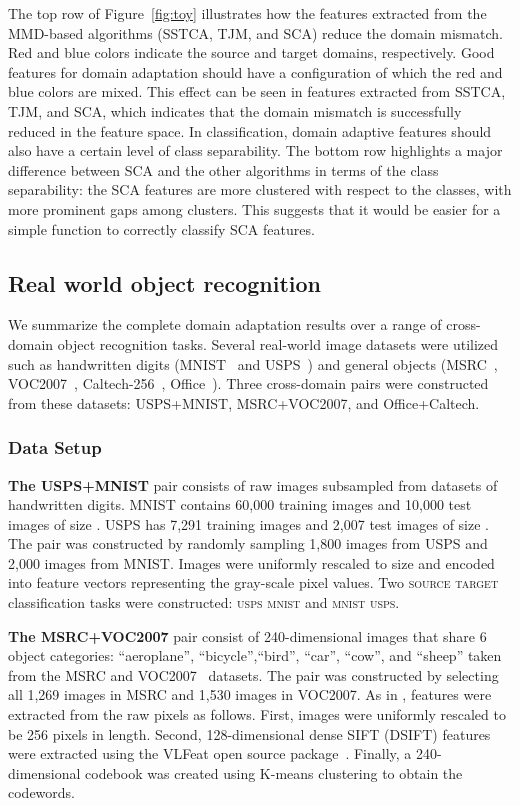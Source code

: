 \documentclass[10pt,journal,compsoc]{IEEEtran}
\begin{document}
The top row of Figure~\ref{fig:toy} illustrates how the features extracted from the MMD-based algorithms (SSTCA, TJM, and SCA) reduce the domain mismatch. 
Red and blue colors indicate the source and target domains, respectively.
Good features for domain adaptation should have a configuration of which the red and blue colors are mixed.
This effect can be seen in features extracted from SSTCA, TJM, and SCA, which indicates that the domain mismatch is successfully reduced in the feature space.
In classification, domain adaptive features should also have a certain level of class separability.
The bottom row highlights a major difference between SCA and the other algorithms in terms of the class separability: the SCA features are more clustered with respect to the classes, with more prominent gaps among clusters.
This suggests that it would be easier for a simple function to correctly classify SCA features.


\subsection{Real world object recognition}
\label{sec:exp1_vals}
We summarize the complete domain adaptation results over a range of cross-domain object recognition tasks.
Several real-world image datasets were utilized such as handwritten digits (MNIST~\cite{LeCun:1998aa} and USPS~\cite{usps1994}) and general objects (MSRC~\cite{msrc2005}, VOC2007~\cite{pascal-voc-2007}, Caltech-256~\cite{Griffin2007}, Office~\cite{Saenko:2010aa}).
Three cross-domain pairs were constructed from these datasets: USPS+MNIST, MSRC+VOC2007, and Office+Caltech.


\subsubsection{Data Setup}
\label{sec:exp1_datasetup}
\textbf{The USPS+MNIST}
pair consists of raw images subsampled from datasets of handwritten digits.
MNIST contains 60,000 training images and 10,000 test images of size .
USPS has 7,291 training images and 2,007 test images of size  \cite{LeCun:1998aa} .
The pair was constructed by randomly sampling 1,800 images from USPS and 2,000 images from MNIST.
Images were uniformly rescaled to size  and encoded into feature vectors representing the gray-scale pixel values.
Two \textsc{source}  \textsc{target} classification tasks were constructed: \textsc{usps}  \textsc{mnist} and \textsc{mnist}  \textsc{usps}.

\textbf{The MSRC+VOC2007}
pair consist of 240-dimensional images that share 6 object categories: ``aeroplane'', ``bicycle'',``bird'', ``car'', ``cow'', and ``sheep'' taken from the MSRC and VOC2007~\cite{pascal-voc-2007} datasets.
The pair was constructed by selecting all 1,269 images in MSRC and 1,530 images in VOC2007.
As in \cite{Long:2013aa}, features were extracted from the raw pixels as follows.
First, images were uniformly rescaled to be 256 pixels in length.  
Second, 128-dimensional dense SIFT (DSIFT) features were extracted using the VLFeat open source package~\cite{vedaldi08vlfeat}. 
Finally, a 240-dimensional codebook was created using K-means clustering to obtain the codewords.
\end{document}
